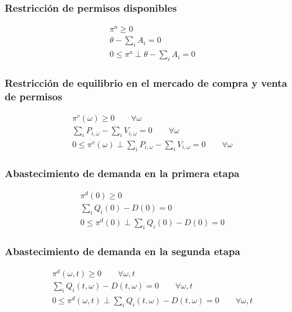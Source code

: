 \subsubsection{Restricción de permisos disponibles}
\begin{footnotesize}
\begin{align}
 \pi^a \geq 0 \\
 \theta - \sum_{i}A_i = 0 \\
0 \leq \pi^a \perp \theta - \sum_{i}A_i= 0 \label{complementariedadcondicion1}
\end{align}
\end{footnotesize}


\subsubsection{Restricción de equilibrio en el mercado de compra y venta de permisos}

\begin{footnotesize}
\begin{align}
 \pi^v(\omega) \geq 0 \qquad \forall \omega\\
 \sum_{i}P_{i,\omega} - \sum_{i}V_{i,\omega} = 0 \qquad \forall \omega \\
0 \leq \pi^v(\omega) \perp \sum_{i}P_{i,\omega} - \sum_{i}V_{i,\omega} = 0 \qquad \forall \omega
\end{align}
\end{footnotesize}


\subsubsection{Abastecimiento de demanda en la primera etapa}

\begin{footnotesize}
\begin{align}
 \pi^d(0) \geq 0 \\
 \sum_{i}Q_i(0) - D(0) = 0\\
0 \leq \pi^d(0) \perp \sum_{i}Q_i(0) - D(0)= 0
\end{align}
\end{footnotesize}


\subsubsection{Abastecimiento de demanda en la segunda etapa}

\begin{footnotesize}
\begin{align}
 \pi^d(\omega,t) \geq 0 \qquad \forall \omega,t\\
 \sum_{i}Q_i(t,\omega) - D(t,\omega) = 0 \qquad \forall \omega,t\\
 0 \leq \pi^d(\omega,t) \perp \sum_{i}Q_i(t,\omega) - D(t,\omega) = 0 \qquad \forall \omega,t
\end{align}
\end{footnotesize}




